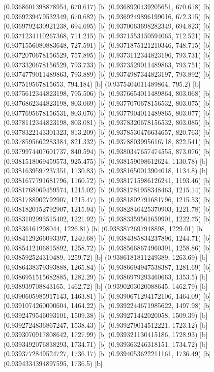 {{{(0.9368601398878954, 670.617) [b] 
(0.9368920439205651, 670.618) [b] 
(0.9369239479532349, 670.682) [b] 
(0.9369249896199016, 672.315) [b] 
(0.9369792430921238, 694.695) [b] 
(0.9370063698282349, 694.823) [b] 
(0.9371234110267368, 711.215) [b] 
(0.9371553150594065, 712.521) [b] 
(0.9371556080883648, 727.591) [b] 
(0.9371875121210346, 748.715) [b] 
(0.9372070678156529, 757.895) [b] 
(0.9373112344823196, 793.731) [b] 
(0.9373320678156529, 793.733) [b] 
(0.9373529011489863, 793.751) [b] 
(0.9374779011489863, 793.889) [b] 
(0.9374987344823197, 793.892) [b] 
(0.937519567815653, 794.184) [b] 
(0.9375404011489864, 795.2) [b] 
(0.9375612344823198, 795.506) [b] 
(0.9376654011489864, 803.068) [b] 
(0.9376862344823198, 803.069) [b] 
(0.9377070678156532, 803.075) [b] 
(0.9377695678156531, 803.076) [b] 
(0.9377904011489865, 803.077) [b] 
(0.9378112344823198, 803.081) [b] 
(0.9378320678156532, 803.085) [b] 
(0.9378322143301323, 813.209) [b] 
(0.9378530476634657, 820.763) [b] 
(0.9378595662283384, 821.332) [b] 
(0.9378803995616718, 822.541) [b] 
(0.9379974407601737, 840.594) [b] 
(0.9380347657474555, 873.076) [b] 
(0.9381518069459573, 925.475) [b] 
(0.938159098612624, 1130.78) [b] 
(0.9381639597237351, 1130.83) [b] 
(0.9381650013904018, 1134.8) [b] 
(0.9381677791681796, 1160.72) [b] 
(0.9381715986126241, 1193.46) [b] 
(0.9381768069459574, 1215.02) [b] 
(0.9381781958348463, 1215.14) [b] 
(0.9381788902792907, 1215.47) [b] 
(0.9381802791681796, 1215.53) [b] 
(0.9381820152792907, 1215.94) [b] 
(0.9382846425370903, 1221.78) [b] 
(0.9383102993515402, 1221.92) [b] 
(0.9383359561659901, 1222.75) [b] 
(0.93836161298044, 1226.81) [b] 
(0.9383872697948898, 1229.01) [b] 
(0.9384129266093397, 1240.68) [b] 
(0.9384385834237896, 1244.71) [b] 
(0.9385412106815892, 1258.72) [b] 
(0.9385668674960391, 1258.86) [b] 
(0.938592524310489, 1259.72) [b] 
(0.9386181811249389, 1263.69) [b] 
(0.9386438379393888, 1265.84) [b] 
(0.9386694947538387, 1281.69) [b] 
(0.9386951515682885, 1282.29) [b] 
(0.9386979293460663, 1353.5) [b] 
(0.938939708843165, 1462.72) [b] 
(0.9390203020088645, 1462.79) [b] 
(0.9390605985917143, 1463.81) [b] 
(0.9390671294172106, 1464.09) [b] 
(0.9391074260000604, 1464.22) [b] 
(0.9392244671985622, 1497.98) [b] 
(0.9392479546093101, 1509.38) [b] 
(0.939271442020058, 1509.39) [b] 
(0.9392724836867247, 1538.43) [b] 
(0.939279014512221, 1723.12) [b] 
(0.9393070917808642, 1727.99) [b] 
(0.939321130415186, 1728.93) [b] 
(0.9393492076838293, 1734.71) [b] 
(0.939363246318151, 1734.72) [b] 
(0.9393772849524727, 1736.17) [b] 
(0.9394053622211161, 1736.49) [b] 
(0.9394334394897595, 1736.5) [b] 
}}}
